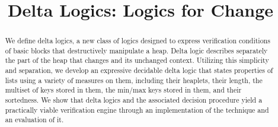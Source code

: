 \documentclass{acmart}
\begin{document}
\newcommand{\HLS}{\textit{HLS}}
\newcommand{\sem}[1]{\llbracket #1 \rrbracket}
\newcommand{\vect}[1]{\overline{#1}}
\pagestyle{plain} %

\title{Delta Logics: Logics for Change}


\maketitle

\begin{abstract}
We define delta logics, a new class of logics designed to express verification conditions
of basic blocks that destructively manipulate a heap. Delta logic describes separately the part of the heap that changes
and its unchanged context. Utilizing this simplicity and separation, we develop an expressive decidable
delta logic that states properties of lists using a variety of measures on them, including their heaplets, 
their length, the multiset of keys stored in them, the min/max keys stored in them, and their sortedness. We show that 
delta logics and the associated decision procedure yield a practically viable verification engine through an 
implementation of the technique and an evaluation of it.
\end{abstract}



%
%
%
%
%
%
%
\newpage


%
%

%
\end{document}
